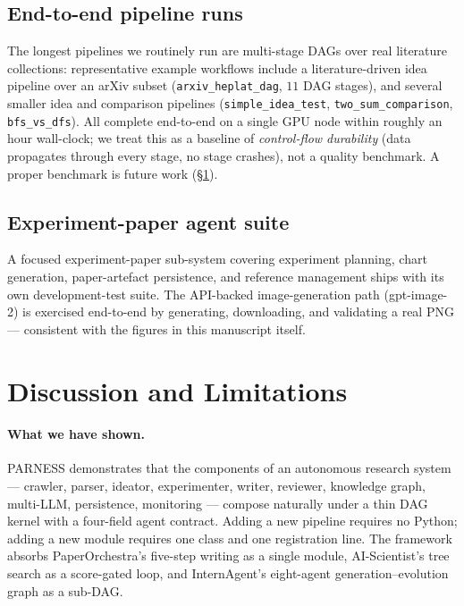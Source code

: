 \documentclass{article}
\newcommand{\parness}{\textsf{PARNESS}}
\newcommand{\code}[1]{\texttt{\small #1}}
\begin{document}
\subsection{End-to-end pipeline runs}
\label{sec:e2e}
The longest pipelines we routinely run are multi-stage DAGs over real
literature collections: representative example workflows include a
literature-driven idea pipeline over an arXiv subset
(\code{arxiv\_heplat\_dag}, $11$ DAG stages), and several smaller idea
and comparison pipelines (\code{simple\_idea\_test},
\code{two\_sum\_comparison}, \code{bfs\_vs\_dfs}). All complete
end-to-end on a single GPU node within roughly an hour wall-clock; we
treat this as a baseline of \emph{control-flow durability} (data
propagates through every stage, no stage crashes), not a quality
benchmark. A proper benchmark is future work (\S\ref{sec:limitations}).

\subsection{Experiment-paper agent suite}
A focused experiment-paper sub-system covering experiment planning,
chart generation, paper-artefact persistence, and reference management
ships with its own development-test suite. The API-backed
image-generation path (gpt-image-2) is exercised end-to-end by
generating, downloading, and validating a real PNG --- consistent with
the figures in this manuscript itself.

\section{Discussion and Limitations}
\label{sec:limitations}

\paragraph{What we have shown.}
\parness{} demonstrates that the components of an autonomous research
system --- crawler, parser, ideator, experimenter, writer, reviewer,
knowledge graph, multi-LLM, persistence, monitoring --- compose
naturally under a thin DAG kernel with a four-field agent contract.
Adding a new pipeline requires no Python; adding a new module requires
one class and one registration line. The framework absorbs PaperOrchestra's
five-step writing as a single module, AI-Scientist's tree search as a
score-gated loop, and InternAgent's eight-agent generation--evolution
graph as a sub-DAG.
\end{document}
